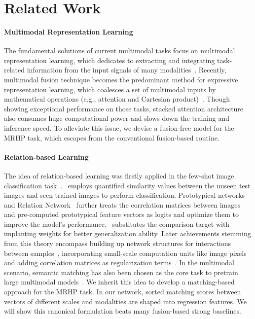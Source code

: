 \section{Related Work}
\paragraph{Multimodal Representation Learning}
The fundamental solutions of current multimodal tasks focus on multimodal representation learning, which dedicates to extracting and integrating task-related information from the input signals of many modalities~\cite{atrey2010multimodal,ngiam2011multimodal}. 
Recently, multimodal fusion technique becomes the predominant method for expressive representation learning, which coalesces a set of multimodal inputs by 
mathematical operations (e.g., attention and Cartesian product)~\cite{liu2018efficient,tsai2019multimodal,mohla2020fusatnet,hazarika2020misa,han2021bi}.
Though showing exceptional performance on 
those tasks, stacked attention architecture also consumes huge computational power and slows down the training and inference speed.
To alleviate this issue, we devise a fusion-free model for the MRHP task, which escapes from the conventional fusion-based routine.

\paragraph{Relation-based Learning}
The idea of relation-based learning was firstly applied in the few-shot image classification task~\cite{vanschoren2018meta,hospedales2020meta}.
\citet{vinyals2016matching}~employs quantified similarity values between the unseen test images and seen trained images to perform classification.
Prototypical networks~\cite{snell2017prototypical} and Relation Network~\citet{sung2018learning} further treats the correlation matrices between images and pre-computed prototypical feature vectors as logits and optimize them to improve the model's performance.
\citet{lifchitz2019dense}~substitutes the comparison target with implanting weights for better generalization ability.
Later achievements stemming from this theory encompass building up network structures for interactions between samples~\cite{garcia2017few,kim2019edge}, incorporating small-scale computation units like image pixels~\cite{chang2018pyramid,si2018dual,hou2019cross,min2021hypercorrelation} and adding correlation matrices as regularization terms~\cite{wertheimer2021few}.
In the multimodal scenario, semantic matching has also been chosen as the core task to pretrain large multimodal models~\cite{chen2020uniter,kim2021vilt,radford2021learning}.
We inherit this idea to develop a matching-based approach for the MRHP task. 
In our network, sorted matching scores between vectors of different scales and modalities are shaped into regression features. 
We will show this canonical formulation beats many fusion-based strong baselines. 

